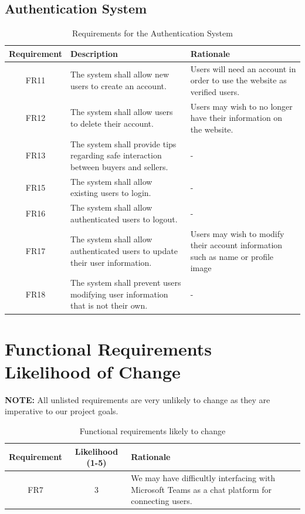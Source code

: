 \documentclass[fullpage]{article}
\begin{document}
\subsection{Authentication System}
\begin{table}[h!]
\flushleft
\begin{tabular}{|c|p{6cm}|p{6cm}|}
\hline
 \rowcolor{lightgray} 
\textbf{Requirement} & \textbf{Description} & \textbf{Rationale} \\
\hline
FR11 &The system shall allow new users to create an account.& Users will need an account in order to use the website as verified users.\\
\hline
FR12&The system shall allow users to delete their account. & Users may wish to no longer have their information on the website.\\
\hline
FR13 & The system shall provide tips regarding safe interaction between buyers and sellers. & -\\
\hline
FR15 &The system shall allow existing users to login.& -\\
\hline
FR16 &The system shall allow authenticated users to logout.& -\\
\hline
FR17 &The system shall allow authenticated users to update their user information.& Users may wish to modify their account information such as name or profile image\\
\hline
FR18 &The system shall prevent users modifying user information that is not their own.& -\\
\hline
\end{tabular}
\caption{Requirements for the Authentication System}
\end{table}

\section{Functional Requirements Likelihood of Change}

\textbf{NOTE:} All unlisted requirements are very unlikely to change as they are imperative to our project goals.
\begin{table}[h!]
\flushleft
\begin{tabular}{|c|c|p{6cm}|}
\hline
 \rowcolor{lightgray} 
\textbf{Requirement} & \textbf{Likelihood (1-5)} & \textbf{Rationale} \\
\hline
FR7 & 3 & We may have difficultly interfacing with Microsoft Teams as a chat platform for connecting users. \\
\hline
\end{tabular}
\caption{Functional requirements likely to change}
\end{table}
\end{document}
